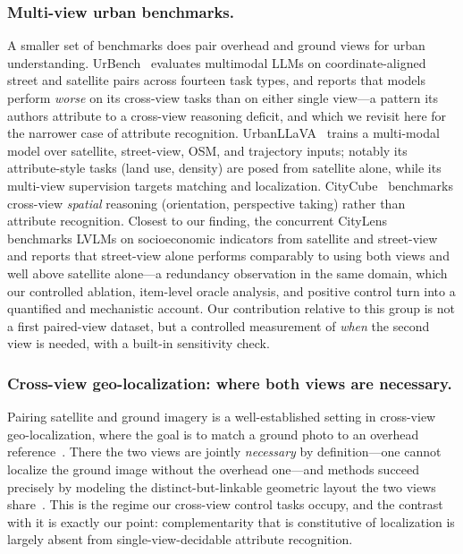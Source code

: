 \documentclass[runningheads]{llncs}
\begin{document}
\subsubsection{Multi-view urban benchmarks.}
A smaller set of benchmarks does pair overhead and ground views for urban
understanding. UrBench~\cite{urbench2025} evaluates multimodal LLMs on
coordinate-aligned street and satellite pairs across fourteen task types, and
reports that models perform \emph{worse} on its cross-view tasks than on either
single view---a pattern its authors attribute to a cross-view reasoning deficit,
and which we revisit here for the narrower case of attribute recognition.
UrbanLLaVA~\cite{urbanllava2025} trains a multi-modal model over satellite,
street-view, OSM, and trajectory inputs; notably its attribute-style tasks (land
use, density) are posed from satellite alone, while its multi-view supervision
targets matching and localization. CityCube~\cite{citycube2026} benchmarks
cross-view \emph{spatial} reasoning (orientation, perspective taking) rather than
attribute recognition. Closest to our finding, the concurrent
CityLens~\cite{citylens2026} benchmarks LVLMs on socioeconomic indicators from
satellite and street-view and reports that street-view alone performs comparably
to using both views and well above satellite alone---a redundancy observation in
the same domain, which our controlled ablation, item-level oracle analysis, and
positive control turn into a quantified and mechanistic account. Our contribution
relative to this group is not a first paired-view dataset, but a controlled
measurement of \emph{when} the second view is needed, with a built-in sensitivity
check.

\subsubsection{Cross-view geo-localization: where both views are necessary.}
Pairing satellite and ground imagery is a well-established setting in cross-view
geo-localization, where the goal is to match a ground photo to an overhead
reference~\cite{durgam2024crossview,zhai2017predicting,zhu2021vigor}. There the
two views are jointly \emph{necessary} by definition---one cannot localize the
ground image without the overhead one---and methods succeed precisely by modeling
the distinct-but-linkable geometric layout the two views
share~\cite{zhang2023geodtr}. This is the regime our cross-view control tasks
occupy, and the contrast with it is exactly our point: complementarity that is
constitutive of localization is largely absent from single-view-decidable
attribute recognition.
\end{document}
